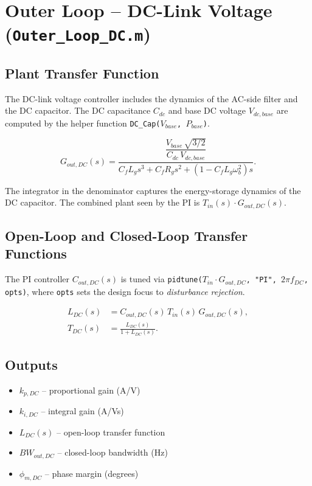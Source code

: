 \documentclass[12pt, a4paper]{article}
\begin{document}
\section{Outer Loop -- DC-Link Voltage (\texttt{Outer\_Loop\_DC.m})}

\subsection{Plant Transfer Function}

The DC-link voltage controller includes the dynamics of the AC-side filter and
the DC capacitor.  The DC capacitance $C_{dc}$ and base DC voltage $V_{dc,base}$
are computed by the helper function \texttt{DC\_Cap($V_{base}$, $P_{base}$)}.

\begin{equation}
    G_{out,DC}(s)
    = \frac{\dfrac{V_{base}\,\sqrt{3/2}}{C_{dc}\,V_{dc,base}}}
           {C_f L_g s^{3}
            + C_f R_g s^{2}
            + \!\left(1 - C_f L_g \omega_b^{2}\right)s}.
\end{equation}

The integrator in the denominator captures the energy-storage dynamics of the DC
capacitor.  The combined plant seen by the PI is $T_{in}(s)\cdot G_{out,DC}(s)$.

\subsection{Open-Loop and Closed-Loop Transfer Functions}

The PI controller $C_{out,DC}(s)$ is tuned via
\texttt{pidtune($T_{in}\cdot G_{out,DC}$, "PI", $2\pi f_{DC}$, opts)},
where \texttt{opts} sets the design focus to \emph{disturbance rejection}.

\begin{align}
    L_{DC}(s) &= C_{out,DC}(s)\,T_{in}(s)\,G_{out,DC}(s), \\[4pt]
    T_{DC}(s) &= \frac{L_{DC}(s)}{1 + L_{DC}(s)}.
\end{align}

\subsection{Outputs}
\begin{itemize}
    \item $k_{p,DC}$ -- proportional gain (A/V)
    \item $k_{i,DC}$ -- integral gain (A/Vs)
    \item $L_{DC}(s)$ -- open-loop transfer function
    \item $BW_{out,DC}$ -- closed-loop bandwidth (Hz)
    \item $\phi_{m,DC}$ -- phase margin (degrees)
\end{itemize}
\end{document}
